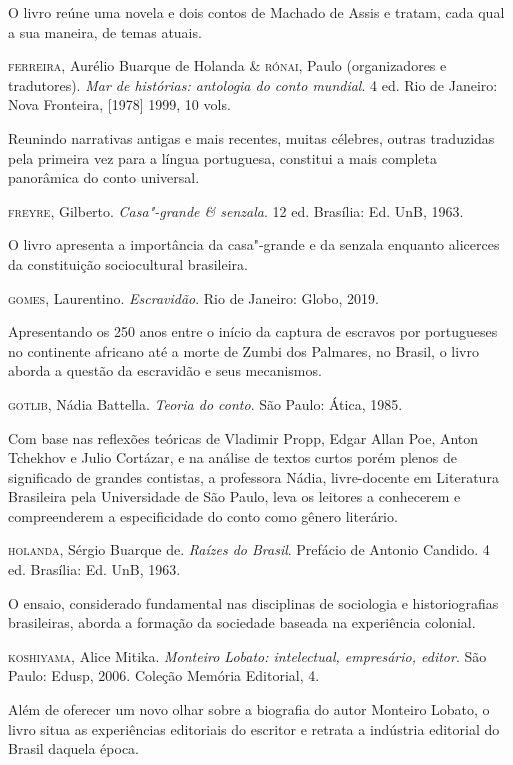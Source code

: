 \documentclass[11pt]{extarticle}
\begin{document}
O livro reúne uma novela e dois contos de Machado de Assis e tratam, cada qual 
a sua maneira, de temas atuais.

\textsc{ferreira}, Aurélio Buarque de Holanda \& \textsc{rónai}, Paulo (organizadores e
tradutores). \emph{Mar de histórias: antologia do conto mundial}. 4 ed.
Rio de Janeiro: Nova Fronteira, {[}1978{]} 1999, 10 vols. 

Reunindo narrativas antigas e mais recentes, muitas célebres, outras traduzidas
pela primeira vez para a língua portuguesa, constitui a mais completa
panorâmica do conto universal.

\textsc{freyre}, Gilberto. \emph{Casa"-grande \& senzala}. 12 ed. Brasília: Ed.
UnB, 1963.

O livro apresenta a importância da casa"-grande e da senzala enquanto alicerces da 
constituição sociocultural brasileira. 

\textsc{gomes}, Laurentino. \emph{Escravidão}. Rio de Janeiro: Globo, 2019.

Apresentando os 250 anos entre o início da captura de escravos por portugueses no 
continente africano até a morte de Zumbi dos Palmares, no Brasil, o livro aborda
a questão da escravidão e seus mecanismos.

\textsc{gotlib}, Nádia Battella. \emph{Teoria do conto}. São Paulo: Ática, 1985.

Com base nas reflexões teóricas de Vladimir Propp, Edgar Allan Poe,
Anton Tchekhov e Julio Cortázar, e na análise de textos curtos porém
plenos de significado de grandes contistas, a professora Nádia,
livre-docente em Literatura Brasileira pela Universidade de São Paulo,
leva os leitores a conhecerem e compreenderem a especificidade do conto
como gênero literário.

\textsc{holanda}, Sérgio Buarque de. \emph{Raízes do Brasil}. Prefácio de Antonio
Candido. 4 ed. Brasília: Ed. UnB, 1963.

O ensaio, considerado fundamental nas disciplinas de sociologia e historiografias 
brasileiras, aborda a formação da sociedade baseada na experiência colonial.

\textsc{koshiyama}, Alice Mitika. \emph{Monteiro Lobato: intelectual, empresário,
editor}. São Paulo: Edusp, 2006. Coleção Memória Editorial, 4.

Além de oferecer um novo olhar sobre a biografia do autor Monteiro Lobato, o livro 
situa as experiências editoriais do escritor e retrata a indústria editorial do 
Brasil daquela época.
\end{document}
